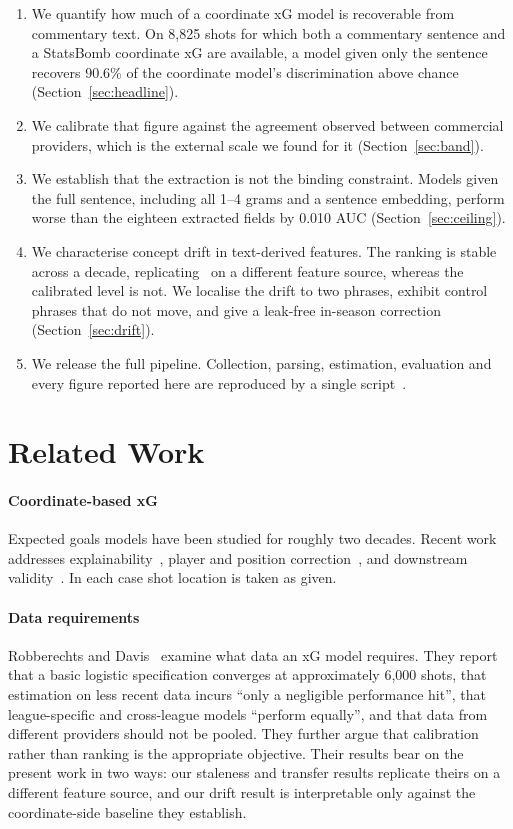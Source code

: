 \documentclass[conference]{IEEEtran}
\newcommand{\num}[1]{\mbox{#1}}
\begin{document}
\begin{enumerate}
\item We quantify how much of a coordinate xG model is recoverable from
commentary text. On \num{8,825} shots for which both a commentary sentence and
a StatsBomb coordinate xG are available, a model given only the sentence
recovers 90.6\% of the coordinate model's discrimination above chance
(Section~\ref{sec:headline}).
\item We calibrate that figure against the agreement observed between
commercial providers, which is the external scale we found for it
(Section~\ref{sec:band}).
\item We establish that the extraction is not the binding constraint. Models
given the full sentence, including all 1--4 grams and a sentence embedding,
perform worse than the eighteen extracted fields by \num{0.010} AUC
(Section~\ref{sec:ceiling}).
\item We characterise concept drift in text-derived features. The ranking is
stable across a decade, replicating~\cite{robberechts2020data} on a different
feature source, whereas the calibrated level is not. We localise the drift to
two phrases, exhibit control phrases that do not move, and give a leak-free
in-season correction (Section~\ref{sec:drift}).
\item We release the full pipeline. Collection, parsing, estimation,
evaluation and every figure reported here are reproduced by a single
script~\cite{xgfromwords2026}.
\end{enumerate}

\section{Related Work}
\label{sec:related}

\paragraph{Coordinate-based xG}
Expected goals models have been studied for roughly two decades. Recent work
addresses explainability~\cite{cavus2022explainable}, player and position
correction~\cite{scholtes2024bayesxg}, and downstream
validity~\cite{mead2023xg}. In each case shot location is taken as given.

\paragraph{Data requirements}
Robberechts and Davis~\cite{robberechts2020data} examine what data an xG model
requires. They report that a basic logistic specification converges at
approximately \num{6,000} shots, that estimation on less recent data incurs
``only a negligible performance hit'', that league-specific and cross-league
models ``perform equally'', and that data from different providers should not
be pooled. They further argue that calibration rather than ranking is the
appropriate objective. Their results bear on the present work in two ways: our
staleness and transfer results replicate theirs on a different feature source,
and our drift result is interpretable only against the coordinate-side
baseline they establish.
\end{document}

